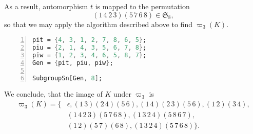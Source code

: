 As a result, automorphism $t$ is mapped to the permutation 
\begin{equation*}
(1\,4\,2\,3)(5\,7\,6\,8)\in\mathfrak{S}_8,
\end{equation*}
so that we may apply the algorithm described above to find $\varpi_3(K)$.
\begin{lstlisting}[language=Mathematica, numbers=left, numberstyle=\tiny, stepnumber=2, numbersep=5pt]
pit = {4, 3, 1, 2, 7, 8, 6, 5};
piu = {2, 1, 4, 3, 5, 6, 7, 8};
piw = {1, 2, 3, 4, 6, 5, 8, 7};
Gen = {pit, piu, piw};

SubgroupSn[Gen, 8];
\end{lstlisting}
We conclude, that the image of $K$ under $\varpi_3$ is
\begin{align*}
\varpi_3(K)=\lbrace	&\epsilon,(1\, 3)(2\, 4)(5\, 6), (1\, 4)(2\, 3)(5\, 6), (1\, 2)(3\, 4),   \\
									&(1\, 4\, 2\, 3)(5\, 7\, 6\, 8), (1\, 3\, 2\, 4)(5\, 8\, 6\, 7), \\
									&(1\, 2)(5\, 7)(6\, 8),   (1\, 3\, 2\, 4)(5\, 7\, 6\, 8)\rbrace.
\end{align*}